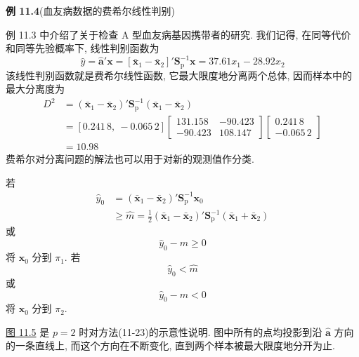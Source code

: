 
\noindent\textbf{例 11.4}\quad (血友病数据的费希尔线性判别)

例 11.3 中介绍了关于检查 A 型血友病基因携带者的研究. 我们记得, 在同等代价和同等先验概率下, 线性判别函数为
\[
\hat{y}=\hat{\mathbf{a}}'\mathbf{x}=[\bar{\mathbf{x}}_1-\bar{\mathbf{x}}_2]'\mathbf{S}_{\mathrm{p}}^{-1}\mathbf{x}=37.61x_1-28.92x_2
\]
该线性判别函数就是费希尔线性函数, 它最大限度地分离两个总体, 因而样本中的最大分离度为
\[
\begin{aligned}
D^2&=(\bar{\mathbf{x}}_1-\bar{\mathbf{x}}_2)'\mathbf{S}_{\mathrm{p}}^{-1}(\bar{\mathbf{x}}_1-\bar{\mathbf{x}}_2)\\
&=[0.241\,8,\ -0.065\,2]\begin{bmatrix}131.158&-90.423\\-90.423&108.147\end{bmatrix}\begin{bmatrix}0.241\,8\\-0.065\,2\end{bmatrix}\\
&=10.98
\end{aligned}
\]
费希尔对分离问题的解法也可以用于对新的观测值作分类.

\begin{mvframe}
若
\label{eq:11-25}
\begin{equation}
\begin{aligned}
\hat{y}_0&=(\bar{\mathbf{x}}_1-\bar{\mathbf{x}}_2)'\mathbf{S}_{\mathrm{p}}^{-1}\mathbf{x}_0\\
&\geqslant\hat{m}=\frac{1}{2}(\bar{\mathbf{x}}_1-\bar{\mathbf{x}}_2)'\mathbf{S}_{\mathrm{p}}^{-1}(\bar{\mathbf{x}}_1+\bar{\mathbf{x}}_2)
\end{aligned}
\tag{11-25}
\end{equation}
或
\[
\hat{y}_0-\hat{m}\geqslant0
\]
将 $\mathbf{x}_0$ 分到 $\pi_1$. 若
\[
\hat{y}_0<\hat{m}
\]
或
\[
\hat{y}_0-\hat{m}<0
\]
将 $\mathbf{x}_0$ 分到 $\pi_2$.
\end{mvframe}


\hyperref[fig:11.5]{图 11.5} 是 $p=2$ 时对方法(11-23)的示意性说明. 图中所有的点均投影到沿 $\hat{\mathbf{a}}$ 方向的一条直线上, 而这个方向在不断变化, 直到两个样本被最大限度地分开为止.

\begin{mvfigure}
\label{fig:11.5}
\end{mvfigure}
